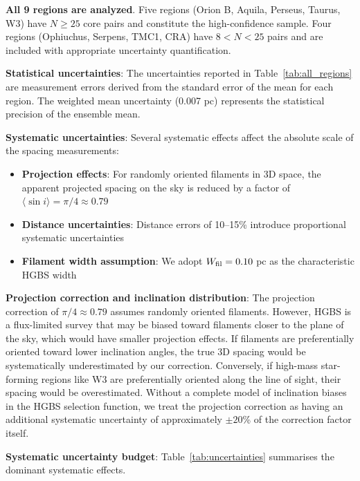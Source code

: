 \documentclass[11pt,a4paper]{article}
\begin{document}
\textbf{All 9 regions are analyzed}. Five regions (Orion B, Aquila, Perseus, Taurus, W3) have $N \geq 25$ core pairs and constitute the high-confidence sample. Four regions (Ophiuchus, Serpens, TMC1, CRA) have $8 < N < 25$ pairs and are included with appropriate uncertainty quantification.

\textbf{Statistical uncertainties}: The uncertainties reported in Table~\ref{tab:all_regions} are measurement errors derived from the standard error of the mean for each region. The weighted mean uncertainty (0.007 pc) represents the statistical precision of the ensemble mean.

\textbf{Systematic uncertainties}: Several systematic effects affect the absolute scale of the spacing measurements:
\begin{itemize}
    \item \textbf{Projection effects}: For randomly oriented filaments in 3D space, the apparent projected spacing on the sky is reduced by a factor of $\langle \sin i \rangle = \pi/4 \approx 0.79$
    \item \textbf{Distance uncertainties}: Distance errors of 10--15\% introduce proportional systematic uncertainties
    \item \textbf{Filament width assumption}: We adopt $W_{\rm fil} = 0.10$ pc as the characteristic HGBS width \citep{Arzoumanian2011}
\end{itemize}

\textbf{Projection correction and inclination distribution}: The projection correction of $\pi/4 \approx 0.79$ assumes randomly oriented filaments. However, HGBS is a flux-limited survey that may be biased toward filaments closer to the plane of the sky, which would have smaller projection effects. If filaments are preferentially oriented toward lower inclination angles, the true 3D spacing would be systematically underestimated by our correction. Conversely, if high-mass star-forming regions like W3 are preferentially oriented along the line of sight, their spacing would be overestimated. Without a complete model of inclination biases in the HGBS selection function, we treat the projection correction as having an additional systematic uncertainty of approximately $\pm20$\% of the correction factor itself.

\textbf{Systematic uncertainty budget}: Table~\ref{tab:uncertainties} summarises the dominant systematic effects.
\end{document}
